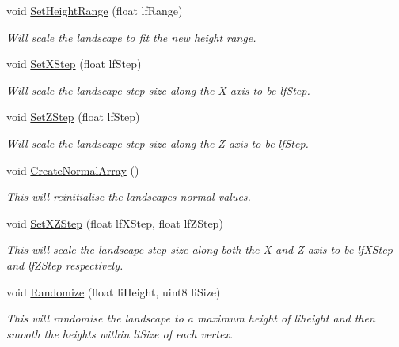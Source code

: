 \begin{DoxyCompactItemize}
void \hyperlink{classcm_landscape_a533445e9429089809658e64114a2b9f7}{SetHeightRange} (float lfRange)
\begin{DoxyCompactList}\small\item\em Will scale the landscape to fit the new height range. \item\end{DoxyCompactList}\item 
void \hyperlink{classcm_landscape_afcb4ebc6f4aa1a61f49ca56bf82ec199}{SetXStep} (float lfStep)
\begin{DoxyCompactList}\small\item\em Will scale the landscape step size along the X axis to be lfStep. \item\end{DoxyCompactList}\item 
void \hyperlink{classcm_landscape_a552a5c4d887833220f02902ab8a1ffb5}{SetZStep} (float lfStep)
\begin{DoxyCompactList}\small\item\em Will scale the landscape step size along the Z axis to be lfStep. \item\end{DoxyCompactList}\item 
void \hyperlink{classcm_landscape_acfa7d1b32173940cfc8a91d6ab5dc370}{CreateNormalArray} ()
\begin{DoxyCompactList}\small\item\em This will reinitialise the landscapes normal values. \item\end{DoxyCompactList}\item 
void \hyperlink{classcm_landscape_a074a4aa5de458c966817b57b8822d470}{SetXZStep} (float lfXStep, float lfZStep)
\begin{DoxyCompactList}\small\item\em This will scale the landscape step size along both the X and Z axis to be lfXStep and lfZStep respectively. \item\end{DoxyCompactList}\item 
void \hyperlink{classcm_landscape_a0ee9507ed64e727af58ccfaacd88d333}{Randomize} (float liHeight, uint8 liSize)
\begin{DoxyCompactList}\small\item\em This will randomise the landscape to a maximum height of liheight and then smooth the heights within liSize of each vertex. \item\end{DoxyCompactList}\item 

\end{DoxyCompactItemize}
